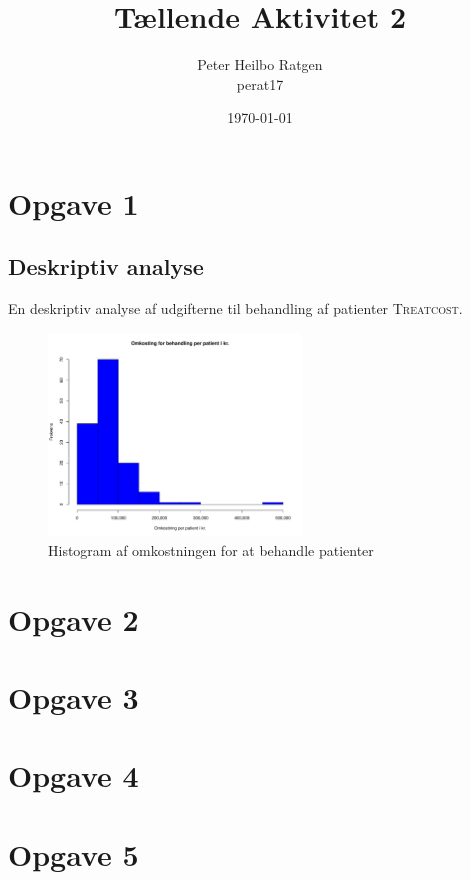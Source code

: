 \documentclass{article}
\title{Tællende Aktivitet 2}
\author{Peter Heilbo Ratgen \\ perat17}
\date{\today}
\begin{document}
\maketitle

\section{Opgave 1}
\subsection{Deskriptiv analyse}
En deskriptiv analyse af udgifterne til behandling af patienter 
\textsc{Treatcost}. 
\begin{figure}[h]
  \centering
  \includegraphics[width=0.6\textwidth]{./treatcost.pdf}
  \caption{Histogram af omkostningen for at behandle patienter}
\end{figure}






\section*{Opgave 2}


\section*{Opgave 3}


\section*{Opgave 4}


\section*{Opgave 5}

\end{document}
